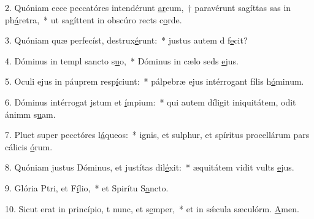 2. Quóniam ecce peccatóres intendérunt \uline{ar}cum,~† paravérunt sagíttas sas in ph\uline{á}retra,~* ut sagíttent in obscúro rects c\uline{o}rde.\par 
3. Quóniam quæ perfecíst, destrux\uline{é}runt:~* justus autem d f\uline{e}cit?\par 
4. Dóminus in templ sancto s\uline{u}o,~* Dóminus in cælo seds \uline{e}jus.\par 
5. Oculi ejus in páuprem resp\uline{í}ciunt:~* pálpebræ ejus intérrogant fílis h\uline{ó}minum.\par 
6. Dóminus intérrogat jstum et \uline{í}mpium:~* qui autem díligit iniquitátem, odit ánimm s\uline{u}am.\par 
7. Pluet super pecctóres l\uline{á}queos:~* ignis, et sulphur, et spíritus procellárum pars cálicis \uline{ó}rum.\par 
8. Quóniam justus Dóminus, et justítas dil\uline{é}xit:~* æquitátem vidit vults \uline{e}jus.\par 
9. Glória Ptri, et F\uline{í}lio,~* et Spirítu S\uline{a}ncto.\par 
10. Sicut erat in princípio, t nunc, et s\uline{e}mper,~* et in sǽcula sæculórm. \uline{A}men.\par 
